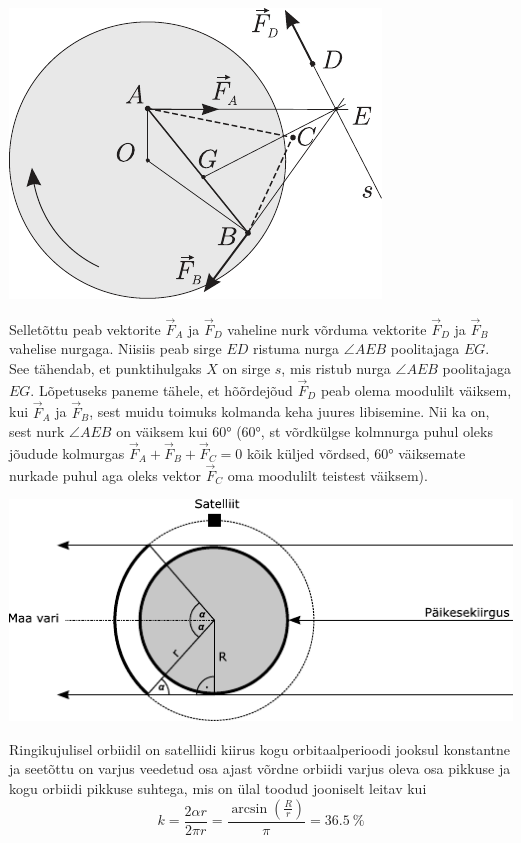 \documentclass[10pt, twoside]{article}
\begin{document}
{\begin{center}
	\includegraphics[width=0.7\linewidth]{2005-v3g-10-lah}
\end{center}

Selletõttu peab vektorite $\vec F_A$ ja $\vec F_D$ vaheline nurk võrduma vektorite $\vec F_D$ ja $\vec F_B$ vahelise nurgaga. Niisiis peab sirge $ED$ ristuma nurga $\angle AEB$ poolitajaga $EG$. See tähendab, et punktihulgaks $X$ on sirge $s$, mis ristub nurga $\angle AEB$ poolitajaga $EG$. Lõpetuseks paneme tähele, et hõõrdejõud $\vec F_D$ peab olema moodulilt väiksem, kui $\vec F_A$ ja $\vec F_B$, sest muidu toimuks kolmanda keha juures libisemine. Nii ka on, sest nurk $\angle AEB$ on väiksem kui \ang{60} (\ang{60}, st võrdkülgse kolmnurga puhul oleks jõudude kolmurgas $\vec F_A + \vec F_B + \vec F_C = 0$ kõik küljed võrdsed, \ang{60} väiksemate nurkade puhul aga oleks vektor $\vec F_C$ oma moodulilt teistest väiksem).
\probend
\bigskip


\solu
\begin{center}
	\includegraphics[width=0.9\linewidth]{2011-v2g-02-lah}
\end{center}
Ringikujulisel orbiidil on satelliidi kiirus kogu orbitaalperioodi jooksul konstantne ja seetõttu on varjus veedetud osa ajast võrdne orbiidi varjus oleva osa pikkuse ja kogu orbiidi pikkuse suhtega, mis on ülal toodud jooniselt leitav kui 
\[
k=\frac{2 \alpha r}{2 \pi r}=\frac{\arcsin \left(\frac{R}{r}\right)}{\pi}=\SI{36,5}{\%}
\]
\probend
\bigskip

}
\end{document}
